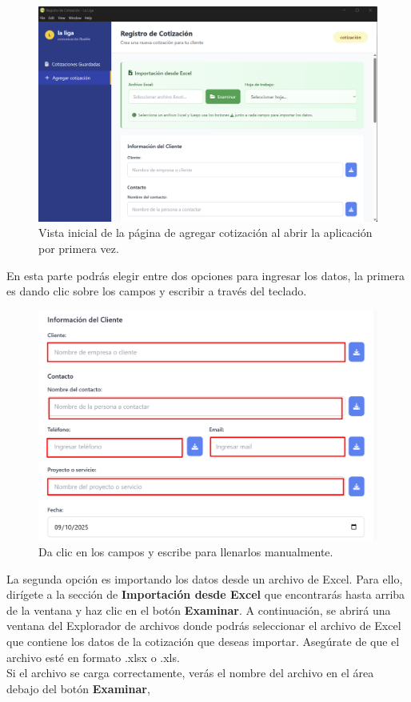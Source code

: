 \documentclass{Pretexto/bluereport}
\begin{document}
\begin{figure}[H] 
    \centering
        \includegraphics[width=0.8\linewidth]{img/add_cotizacion_inicial.png}
\caption{Vista inicial de la página de agregar cotización al abrir la aplicación por primera vez.}\label{fig:vista_inicial_add}
\end{figure}
En esta parte podrás elegir entre dos opciones para ingresar los datos, la primera es dando clic sobre los campos y escribir a través del teclado.
\begin{figure}[H] 
    \centering
        \includegraphics[width=0.7\linewidth]{img/llenar_campos.png}
    \caption{Da clic en los campos y escribe para llenarlos manualmente.}
    \label{fig:llenado_manual1}
\end{figure}
La segunda opción es importando los datos desde un archivo de Excel. Para ello, dirígete a la sección de 
\textbf{Importación desde Excel} que encontrarás hasta arriba de la ventana y haz clic en el botón \textbf{Examinar}. A continuación, se abrirá una ventana 
del Explorador de archivos donde podrás seleccionar el archivo de Excel que contiene los datos de la cotización que deseas importar. Asegúrate de que el archivo 
esté en formato .xlsx o .xls.\\
Si el archivo se carga correctamente, verás el nombre del archivo en el área debajo del botón \textbf{Examinar}, 
\end{document}
